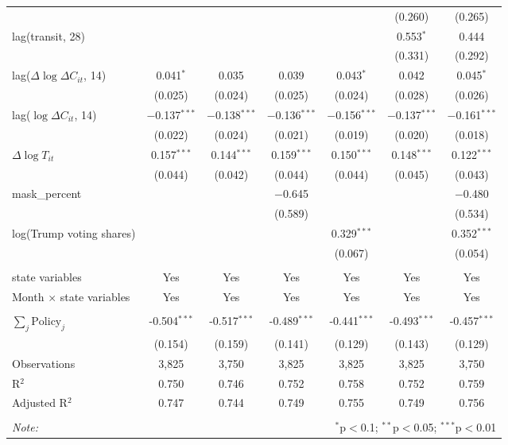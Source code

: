 \begin{tabular}{@{\extracolsep{1pt}}lcccccc}
  &  &  &  &  & (0.260) & (0.265) \\ 
  lag(transit, 28) &  &  &  &  & 0.553$^{*}$ & 0.444 \\ 
  &  &  &  &  & (0.331) & (0.292) \\ 
  lag($\Delta \log \Delta C_{it}$, 14) & 0.041$^{*}$ & 0.035 & 0.039 & 0.043$^{*}$ & 0.042 & 0.045$^{*}$ \\ 
  & (0.025) & (0.024) & (0.025) & (0.024) & (0.028) & (0.026) \\ 
  lag($\log \Delta C_{it}$, 14) & $-$0.137$^{***}$ & $-$0.138$^{***}$ & $-$0.136$^{***}$ & $-$0.156$^{***}$ & $-$0.137$^{***}$ & $-$0.161$^{***}$ \\ 
  & (0.022) & (0.024) & (0.021) & (0.019) & (0.020) & (0.018) \\ 
  $\Delta \log T_{it}$ & 0.157$^{***}$ & 0.144$^{***}$ & 0.159$^{***}$ & 0.150$^{***}$ & 0.148$^{***}$ & 0.122$^{***}$ \\ 
  & (0.044) & (0.042) & (0.044) & (0.044) & (0.045) & (0.043) \\ 
  mask\_percent &  &  & $-$0.645 &  &  & $-$0.480 \\ 
  &  &  & (0.589) &  &  & (0.534) \\ 
  log(Trump voting shares) &  &  &  & 0.329$^{***}$ &  & 0.352$^{***}$ \\ 
  &  &  &  & (0.067) &  & (0.054) \\ 
 \hline \\[-1.8ex] 
state variables & Yes & Yes & Yes & Yes & Yes & Yes \\ 
Month $\times$ state variables & Yes & Yes & Yes & Yes & Yes & Yes \\ 
\hline \\[-1.8ex] 
$\sum_j \mathrm{Policy}_j$ & -0.504$^{***}$ & -0.517$^{***}$ & -0.489$^{***}$ & -0.441$^{***}$ & -0.493$^{***}$ & -0.457$^{***}$ \\ 
 & (0.154) & (0.159) & (0.141) & (0.129) & (0.143) & (0.129) \\ 
Observations & 3,825 & 3,750 & 3,825 & 3,825 & 3,825 & 3,750 \\ 
R$^{2}$ & 0.750 & 0.746 & 0.752 & 0.758 & 0.752 & 0.759 \\ 
Adjusted R$^{2}$ & 0.747 & 0.744 & 0.749 & 0.755 & 0.749 & 0.756 \\ 
\hline 
\hline \\[-1.8ex] 
\textit{Note:}  & \multicolumn{6}{r}{$^{*}$p$<$0.1; $^{**}$p$<$0.05; $^{***}$p$<$0.01} \\ 
\end{tabular} 